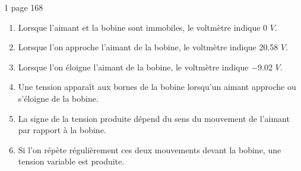 \begin{myact}{1 page 168}
	\begin{enumerate}
		\item Lorsque l'aimant et la bobine sont immobiles, le voltmètre indique 0 $V$.\pause
		\item Lorsque l'on approche l'aimant de la bobine, le voltmètre indique \num{20.58} $V$.\pause
		\item Lorsque l'on éloigne l'aimant de la bobine, le voltmètre indique \num{-9.02} $V$.\pause
		\item Une tension apparaît aux bornes de la bobine lorsqu'un aimant approche ou s'éloigne de la bobine.\pause
		\item La signe de la tension produite dépend du sens du mouvement de l'aimant par rapport à la bobine.\pause
		\item Si l'on répète régulièrement ces deux mouvements devant la bobine, une tension variable est produite.
	\end{enumerate}
\end{myact}